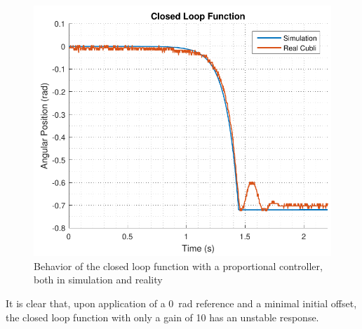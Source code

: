 \begin{figure}[H] 
	\centering 
	\includegraphics[scale=0.5]{figures/closedLoopResponse}	
	\caption{Behavior of the closed loop function with a proportional controller, both in simulation and reality}
	\label{closedLoopResponse}
\end{figure}
%
It is clear that, upon application of a \SI{0}{rad} reference and a minimal initial offset, the closed loop function with only a gain of 10 has an unstable response.
